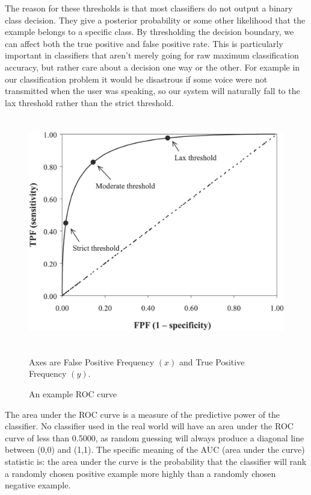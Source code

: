 \documentclass[ %
                    author={Sam Phippen},
                supervisor={Dr. Rafal Bogacz},
                     title={Real time voice activity detectors in noisy personal computing environments},
                  subtitle={},
                    degree={MEng},
                      year={2012} ]{thesis}
\begin{document}
The reason for these thresholds is that most classifiers do not output a binary
class decision. They give a posterior probability or some other likelihood that
the example belongs to a specific class. By thresholding the decision boundary,
we can affect both the true positive and false positive rate. This is
particularly important in classifiers that aren't merely going for raw maximum
classification accuracy, but rather care about a decision one way or the other.
For example in our classification problem it would be disastrous if some voice
were not transmitted when the user was speaking, so our system will naturally
fall to the lax threshold rather than the strict threshold.

\begin{figure}
    \begin{center}
        \includegraphics[height=10cm]{roc_example.png}
    \end{center}
    
    Axes are False Positive Frequency $(x)$ and True Positive Frequency $(y)$.
    
    \caption{An example ROC curve}
    \label{fig:roc-example}
\end{figure}

The area under the ROC curve is a measure of the predictive power of the
classifier\cite{fawcett}. No classifier used in the real world will have an
area under the ROC curve of less than 0.5000, as random guessing will always
produce a diagonal line between (0,0) and (1,1). The specific meaning of the
AUC (area under the curve) statistic is: the area under the curve is the
probability that the classifier will rank a randomly chosen positive example
more highly than a randomly chosen negative example.
\end{document}
